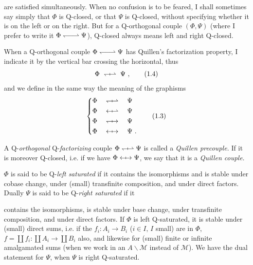 \documentclass[11pt]{article}
\newcommand{\printedpage}[1]{\marginpar{\footnotesize p.~#1}}
\newcommand{\msp}[1]{\marginpar{\footnotesize [#1]}}
\newcommand{\Qo}{\mathrel{\leftharpoondown\joinrel\relbar\joinrel\rightharpoonup}}   %
\newcommand{\Qx}[2]{\mathrel{#1\joinrel\mapstochar#2}}
\begin{document}
\msp{page 2}

are satisfied simultaneously. When no confusion is to be feared, I shall sometimes say simply that $\Phi$ is Q-closed, or that $\Psi$ is Q-closed, without specifying whether it is on the left or %
on the right. But for a Q-orthogonal couple $(\Phi, \Psi)$ (where I prefer to write it $\Phi \Qo \Psi$), Q-closed %
always means left and right Q-closed.

When a Q-orthogonal couple $\Phi \Qo \Psi$ has Quillen's factorization property, I indicate it by the vertical bar crossing the horizontal, thus
\[
\Phi \ \Qx{\leftharpoondown}{\rightharpoonup} \ \Psi\ ,
\tag*{(1.4)}
\]
and we define in the same way the meaning of the graphisms
\[
\left\{
\begin{aligned}
&\Phi \quad \Qx{\leftharpoondown}{\rightharpoonup} \quad \Psi\\
&\Phi \quad \Qx{\leftarrow}{\rightharpoonup} \quad \Psi\\
&\Phi \quad \Qx{\leftharpoondown}{\rightarrow} \quad \Psi\\
&\Phi \quad \Qx{\leftarrow}{\rightarrow} \quad \Psi\ .
\end{aligned}
\right.
\tag*{(1.3)} %
\]

\newpage

\printedpage{2}

A Q-\textit{orthogonal} Q-\textit{factorizing} couple $\Phi \Qx{\leftharpoondown}{\rightharpoonup} \Psi$ is called a \textit{Quillen precouple.} If it is moreover Q-closed, i.e. if we have $\Phi \Qx{\leftarrow}{\rightarrow} \Psi$, we say that it is a \textit{Quillen couple.}

$\Phi$ is said to be Q-\textit{left saturated} if it contains the isomorphisms and is stable under cobase change, under (small) transfinite composition, and under direct factors. Dually $\Psi$ is said to be Q-\textit{right saturated} if it

\msp{page 3}

contains the isomorphisms, is stable under base change, under transfinite composition, and under direct factors. If $\Phi$ is left Q-saturated, it is stable under (small) direct sums, i.e. if the $f_i : A_i \longrightarrow B_i$ ($i \in I$, $I$ small) are in $\Phi$, $f = \coprod f_i : \coprod A_i \longrightarrow \coprod B_i$ also, and likewise for (small) finite or infinite amalgamated sums (when we work in an $A\backslash\mathcal{M}$ instead of $\mathcal{M}$). We have the dual statement for $\Psi$, when $\Psi$ is right Q-saturated.
\end{document}
